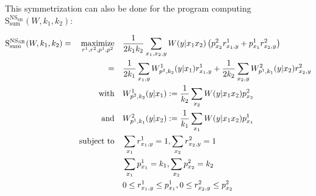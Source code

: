 This symmetrization can also be done for the program computing $\mathrm{S}_{\text{sum}}^{\mathrm{NS}_{\mathrm{SR}}}(W,k_1,k_2)$:
\begin{proposition}
  \label{prop:NSsrProgram}
  \begin{equation}
    \begin{aligned}
      \mathrm{S}_{\text{sum}}^{\mathrm{NS}_{\mathrm{SR}}}(W,k_1,k_2) = &&\underset{r^1,r^2,p^1,p^2}{\operatorname{\text{maximize}}} &&& \frac{1}{2k_1k_2} \sum_{x_1,x_2,y} W(y|x_1x_2)\left(p^2_{x_2}r^1_{x_1,y} + p^1_{x_1}r^2_{x_2,y}\right)\\
      && = &&& \frac{1}{2k_1}\sum_{x_1,y} W^1_{p^2,k_2}(y|x_1)r^1_{x_1,y} + \frac{1}{2k_2}\sum_{x_2,y}W^2_{p^1,k_1}(y|x_2)r^2_{x_2,y}\\
      && \text{with} &&& W^1_{p^2,k_2}(y|x_1) := \frac{1}{k_2}\sum_{x_2} W(y|x_1x_2)p^2_{x_2}\\
      && \text{and} &&& W^2_{p^1,k_1}(y|x_2) := \frac{1}{k_1}\sum_{x_1} W(y|x_1x_2)p^1_{x_1}\\
      &&\operatorname{\text{subject to}} &&& \sum_{x_1} r^1_{x_1,y} = 1, \sum_{x_2} r^2_{x_2,y} = 1\\
      &&&&& \sum_{x_1} p^1_{x_1} = k_1, \sum_{x_2} p^2_{x_2} = k_2\\
      &&&&& 0 \leq r^1_{x_1,y} \leq p^1_{x_1}, 0 \leq r^2_{x_2,y} \leq p^2_{x_2}
    \end{aligned}
  \end{equation}
\end{proposition}

